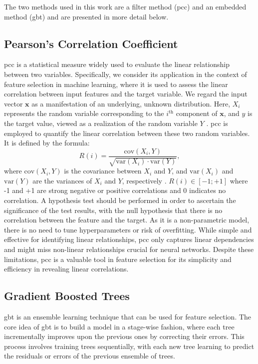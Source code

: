 \documentclass[12pt, a4paper, headinclude, twoside, plainheadsepline, open=right, numbers=noenddot, hidelinks, toc=listof, toc=bibliography]{scrreprt}
\begin{document}
The two methods used in this work are a filter method (\ac{pcc}) and an embedded method (\ac{gbt}) and are presented in more detail below.


\subsection*{Pearson's Correlation Coefficient}
\label{ssec:pearsons}
\Ac{pcc} is a statistical measure widely used to evaluate the linear relationship between two variables. 
Specifically, we consider its application in the context of feature selection in machine learning, where it is used to assess the linear correlation between input features and the target variable. 
We regard the input vector $\mathbf{x}$ as a manifestation of an underlying, unknown distribution. 
Here, $X_i$ represents the random variable corresponding to the $i^{\text{th}}$ component of $\mathbf{x}$, and $y$ is the target value, viewed as a realization of the random variable $Y$ \cite{guyonIntroductionVariableFeature2003}. 
\Ac{pcc} is employed to quantify the linear correlation between these two random variables. It is defined by the formula:
\begin{equation}
R(i) = \frac{\text{cov}(X_i, Y)}{\sqrt{\text{var}(X_i) \cdot \text{var}(Y)}},
\end{equation}
where $\text{cov}(X_i, Y)$ is the covariance between $X_i$ and $Y$, and $\text{var}(X_i)$ and $\text{var}(Y)$ are the variances of $X_i$ and $Y$, respectively \cite{chandrashekarSurveyFeatureSelection2014}.
$R(i) \in [-1; +1]$ where -1 and +1 are strong negative or positive correlations and 0 indicates no correlation. 
A hypothesis test should be performed in order to ascertain the significance of the test results, with the null hypothesis that there is no correlation between the feature and the target.
As it is a non-parametric model, there is no need to tune hyperparameters or risk of overfitting.
While simple and effective for identifying linear relationships, \ac{pcc} only captures linear dependencies and might miss non-linear relationships crucial for neural networks.
Despite these limitations, \ac{pcc} is a valuable tool in feature selection for its simplicity and efficiency in revealing linear correlations.

\subsection*{Gradient Boosted Trees}
\label{ssec:gbt}

\Ac{gbt} is an ensemble learning technique that can be used for feature selection. 
The core idea of \ac{gbt} is to build a model in a stage-wise fashion, where each tree incrementally improves upon the previous ones by correcting their errors. 
This process involves training trees sequentially, with each new tree learning to predict the residuals or errors of the previous ensemble of trees.
\end{document}
